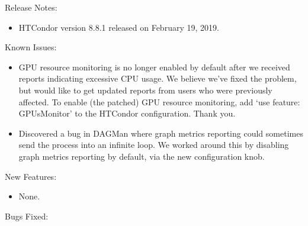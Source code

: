 \noindent Release Notes:

\begin{itemize}

\item HTCondor version 8.8.1 released on February 19, 2019.

\end{itemize}

\noindent Known Issues:

\begin{itemize}

\item GPU resource monitoring is no longer enabled by default after we
received reports indicating excessive CPU usage.  We believe we've fixed
the problem, but would like to get updated reports from users who were
previously affected.  To enable (the patched) GPU resource monitoring,
add `use feature: GPUsMonitor' to the HTCondor configuration.  Thank you.


\item Discovered a bug in DAGMan where graph metrics reporting could sometimes 
send the  process into an infinite loop. We worked around this 
by disabling graph metrics reporting by default, via the new  
 configuration knob.

\end{itemize}


\noindent New Features:

\begin{itemize}

\item None.

\end{itemize}

\noindent Bugs Fixed:

